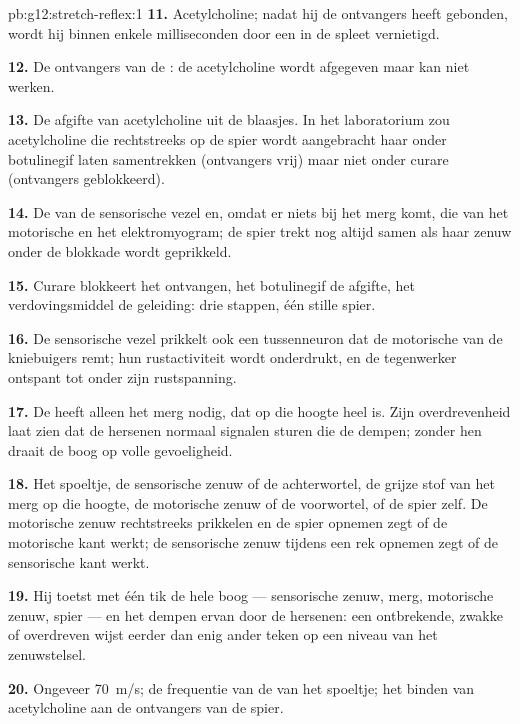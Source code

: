 \begin{solution}{pb:g12:stretch-reflex:1}
\textbf{11.} Acetylcholine; nadat hij de ontvangers heeft gebonden, wordt
hij binnen enkele milliseconden door een  in de spleet vernietigd.

\textbf{12.} De ontvangers van de : de acetylcholine wordt
afgegeven maar kan niet werken.

\textbf{13.} De afgifte van acetylcholine uit de blaasjes. In het
laboratorium zou acetylcholine die rechtstreeks op de spier wordt
aangebracht haar onder botulinegif laten samentrekken (ontvangers vrij)
maar niet onder curare (ontvangers geblokkeerd).

\textbf{14.} De  van de sensorische vezel en, omdat er
niets bij het merg komt, die van het motorische  en het
elektromyogram; de spier trekt nog altijd samen als haar zenuw onder de
blokkade wordt geprikkeld.

\textbf{15.} Curare blokkeert het ontvangen, het botulinegif de afgifte,
het verdovingsmiddel de geleiding: drie stappen, één stille spier.

\textbf{16.} De sensorische vezel prikkelt ook een tussenneuron dat de
motorische  van de kniebuigers remt; hun rustactiviteit wordt
onderdrukt, en de tegenwerker ontspant tot onder zijn rustspanning.

\textbf{17.} De  heeft alleen het merg nodig, dat op die hoogte heel
is. Zijn overdrevenheid laat zien dat de hersenen normaal signalen sturen
die de  dempen; zonder hen draait de boog op volle gevoeligheid.

\textbf{18.} Het spoeltje, de sensorische zenuw of de achterwortel, de
grijze stof van het merg op die hoogte, de motorische zenuw of de
voorwortel, of de spier zelf. De motorische zenuw rechtstreeks prikkelen
en de spier opnemen zegt of de motorische kant werkt; de sensorische zenuw
tijdens een rek opnemen zegt of de sensorische kant werkt.

\textbf{19.} Hij toetst met één tik de hele boog --- sensorische zenuw,
merg, motorische zenuw, spier --- en het dempen ervan door de hersenen:
een ontbrekende, zwakke of overdreven  wijst eerder dan enig ander
teken op een niveau van het zenuwstelsel.

\textbf{20.} Ongeveer \qty{70}{m/s}; de frequentie van de
 van het spoeltje; het binden van acetylcholine aan de
ontvangers van de spier.
\end{solution}
